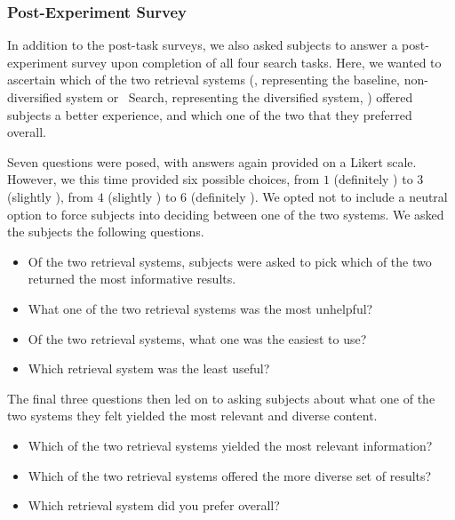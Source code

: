\subsubsection{Post-Experiment Survey}\label{sec:diversity:users:postexp}
In addition to the post-task surveys, we also asked subjects to answer a post-experiment survey upon completion of all four search tasks. Here, we wanted to ascertain which of the two retrieval systems (\hula, representing the baseline, non-diversified system  or \yoyo~Search, representing the diversified system, ) offered subjects a better experience, and which one of the two that they preferred overall.

Seven questions were posed, with answers again provided on a Likert scale. However, we this time provided six possible choices, from $1$ (definitely \hula) to $3$ (slightly \hula), from $4$ (slightly \yoyo) to $6$ (definitely \yoyo). We opted not to include a neutral option to force subjects into deciding between one of the two systems. We asked the subjects the following questions.

\begin{itemize}
    \item{ Of the two retrieval systems, subjects were asked to pick which of the two returned the most informative results.}
    \item{ What one of the two retrieval systems was the most unhelpful?}
    \item{ Of the two retrieval systems, what one was the easiest to use?}
    \item{ Which retrieval system was the least useful?}
\end{itemize}

The final three questions then led on to asking subjects about what one of the two systems they felt yielded the most relevant and diverse content.

\begin{itemize}
    \item{ Which of the two retrieval systems yielded the most relevant information?}
    \item{ Which of the two retrieval systems offered the more diverse set of results?}
    \item{ Which retrieval system did you prefer overall?}
\end{itemize}

